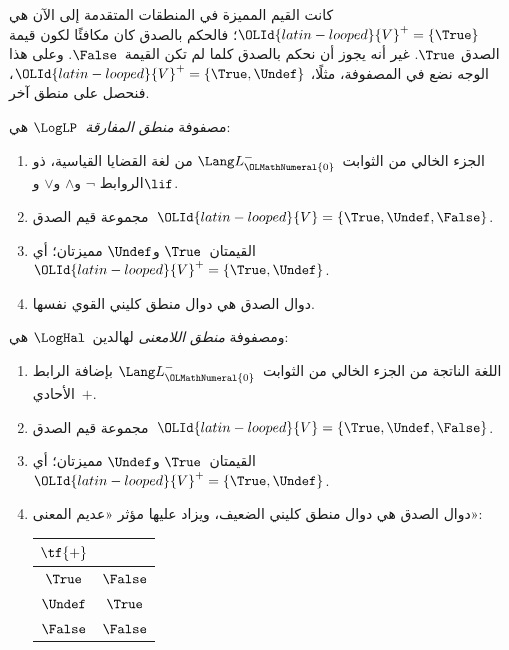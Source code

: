 \documentclass[../../../include/open-logic-section]{subfiles}
\begin{document}


كانت القيم المميزة في المنطقات المتقدمة إلى الآن هي
${\OLId{latin-looped}{V}}^+ = \{\True\}$؛ فالحكم بالصدق كان مكافئًا لكون قيمة الصدق
$\True$. غير أنه يجوز أن نحكم بالصدق كلما لم تكن القيمة~$\False$.
وعلى هذا الوجه نضع في المصفوفة، مثلًا،
${\OLId{latin-looped}{V}}^+ = \{\True, \Undef\}$، فنحصل على منطق آخر.

\begin{defn}
مصفوفة \emph{منطق المفارقة}~$\LogLP$ هي:
\begin{enumerate}
  \item الجزء الخالي من الثوابت~$\Lang L_{\OLMathNumeral{0}}^{-}$ من لغة القضايا القياسية، ذو الروابط
  $\lnot$ و$\land$ و$\lor$ و$\lif$.
  \item مجموعة قيم الصدق~${\OLId{latin-looped}{V}} = \{\True, \Undef, \False\}$.
  \item القيمتان~$\True$ و$\Undef$ مميزتان؛ أي
  ${\OLId{latin-looped}{V}}^+ = \{\True, \Undef\}$.
  \item دوال الصدق هي دوال منطق كليني القوي نفسها.
\end{enumerate}
\end{defn}

\begin{defn}
ومصفوفة \emph{منطق اللامعنى} لهالدين~$\LogHal$ هي:
\begin{enumerate}
  \item اللغة الناتجة من الجزء الخالي من الثوابت~$\Lang L_{\OLMathNumeral{0}}^{-}$
  بإضافة الرابط الأحادي~$+$.
  \item مجموعة قيم الصدق~${\OLId{latin-looped}{V}} = \{\True, \Undef, \False\}$.
  \item القيمتان~$\True$ و$\Undef$ مميزتان؛ أي
  ${\OLId{latin-looped}{V}}^+ = \{\True, \Undef\}$.
  \item دوال الصدق هي دوال منطق كليني الضعيف، ويزاد عليها مؤثر
  «عديم المعنى»:
  \begin{center}
    \begin{tabular}{c|c}
    $\tf{+}$ & \\
    \hline
    $\True$ & $\False$ \\
    $\Undef$ & $\True$ \\
    $\False$ & $\False$
    \end{tabular}
  \end{center}
\end{enumerate}
\end{defn}
\end{document}
